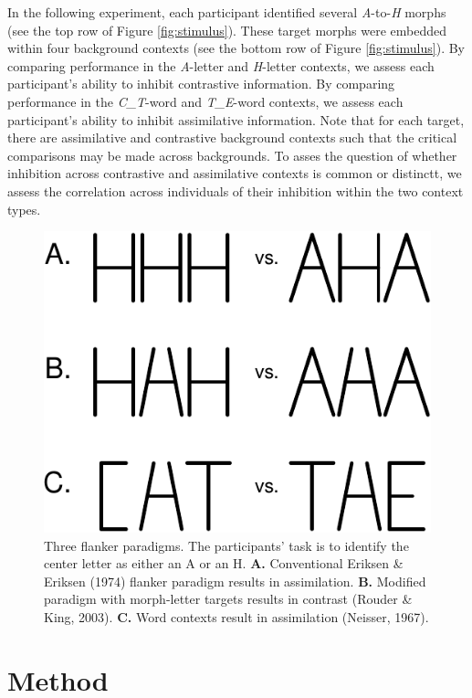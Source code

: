 \documentclass[english,floatsintext,man]{apa6}
\begin{document}
In the following experiment, each participant identified several
\emph{A}-to-\emph{H} morphs (see the top row of Figure
\ref{fig:stimulus}). These target morphs were embedded within four
background contexts (see the bottom row of Figure \ref{fig:stimulus}).
By comparing performance in the \emph{A}-letter and \emph{H}-letter
contexts, we assess each participant's ability to inhibit contrastive
information. By comparing performance in the \emph{C\_T}-word and
\emph{T\_E}-word contexts, we assess each participant's ability to
inhibit assimilative information. Note that for each target, there are
assimilative and contrastive background contexts such that the critical
comparisons may be made across backgrounds. To asses the question of
whether inhibition across contrastive and assimilative contexts is
common or distinctt, we assess the correlation across individuals of
their inhibition within the two context types.

\begin{figure}[htbp]
\centering
\includegraphics{paper_files/figure-latex/past-1.pdf}
\caption{\label{fig:past}Three flanker paradigms. The participants' task is
to identify the center letter as either an A or an H. \textbf{A.}
Conventional Eriksen \& Eriksen (1974) flanker paradigm results in
assimilation. \textbf{B.} Modified paradigm with morph-letter targets
results in contrast (Rouder \& King, 2003). \textbf{C.} Word contexts
result in assimilation (Neisser, 1967).}
\end{figure}

\section{Method}\label{method}
\end{document}
